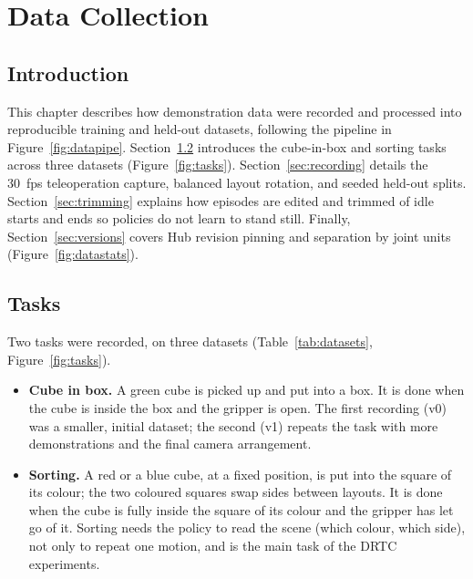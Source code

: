 \chapter{Data Collection}\label{ch:data}

\section{Introduction}
This chapter describes how demonstration data were recorded and processed into reproducible training and held-out datasets, following the pipeline in Figure~\ref{fig:datapipe}. Section~\ref{sec:tasks} introduces the cube-in-box and sorting tasks across three datasets (Figure~\ref{fig:tasks}). Section~\ref{sec:recording} details the 30~fps teleoperation capture, balanced layout rotation, and seeded held-out splits. Section~\ref{sec:trimming} explains how episodes are edited and trimmed of idle starts and ends so policies do not learn to stand still. Finally, Section~\ref{sec:versions} covers Hub revision pinning and separation by joint units (Figure~\ref{fig:datastats}).


\section{Tasks}\label{sec:tasks}

Two tasks were recorded, on three datasets (Table~\ref{tab:datasets}, Figure~\ref{fig:tasks}).
\begin{itemize}
\item \textbf{Cube in box.} A green cube is picked up and put into a box. It is done when the cube is inside the box
      and the gripper is open. The first recording (v0) was a smaller, initial dataset; the second (v1) repeats the
      task with more demonstrations and the final camera arrangement.
\item \textbf{Sorting.} A red or a blue cube, at a fixed position, is put into the square of its colour; the two
      coloured squares swap sides between layouts. It is done when the cube is fully inside the square of its colour
      and the gripper has let go of it. Sorting needs the policy to read the scene (which colour, which side), not
      only to repeat one motion, and is the main task of the DRTC experiments.
\end{itemize}

\begin{table}[htbp]
  \centering
  \small
  \caption{Datasets (pinned Hub revisions). Episodes: training + held out. Joint units: degrees, or LeRobot's normalised range ($-100$ to $100$) for
           the cube-in-box recordings.}\label{tab:datasets}
\end{table}

